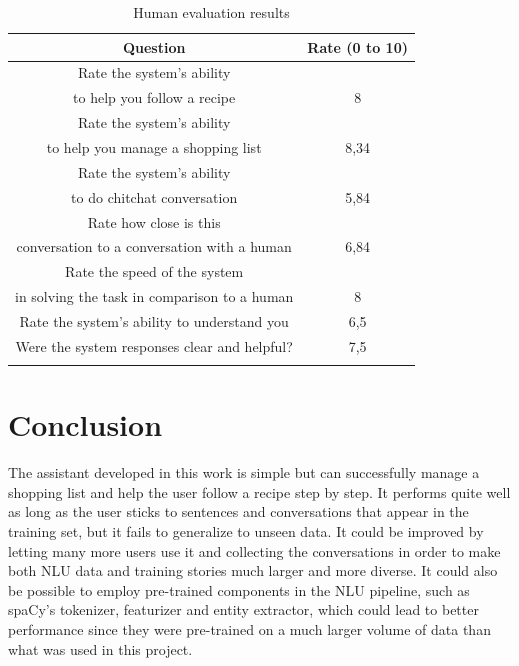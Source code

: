 \documentclass[journal, 11pt]{IEEEtran}
\begin{document}
\begin{table}[ht]
    \centering
    \begin{tabular}{@{}cc@{}}
        \toprule
        \textbf{Question}                                                           & \textbf{Rate (0 to 10)} \\ \midrule
        Rate the system's ability\\ to help you follow a recipe                     & 8                       \\
        Rate the system's ability\\ to help you manage a shopping list              & 8,34                    \\
        Rate the system's ability\\ to do chitchat conversation                     & 5,84                    \\
        Rate how close is this\\ conversation to a conversation with a human        & 6,84                    \\
        Rate the speed of the system\\ in solving the task in comparison to a human & 8                       \\
        Rate the system's ability to understand you                                 & 6,5                     \\
        Were the system responses clear and helpful?                                & 7,5                     \\ \bottomrule\\
    \end{tabular}
    \caption{Human evaluation results}
    \label{tab:human-eval}
\end{table}


\section{Conclusion}
The assistant developed in this work is simple but can successfully manage a shopping list and help the user follow a recipe step by step.
It performs quite well as long as the user sticks to sentences and conversations that appear in the training set, but it fails to generalize to unseen data.
It could be improved by letting many more users use it and collecting the conversations in order to make both NLU data and training stories much larger and more diverse.
It could also be possible to employ pre-trained components in the NLU pipeline, such as spaCy's \cite{spacy} tokenizer, featurizer and entity extractor, which could lead to better performance since they were pre-trained on a much larger volume of data than what was used in this project.
\end{document}
